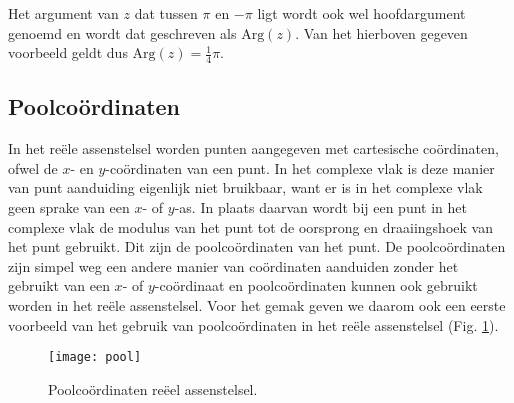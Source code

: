 \documentclass[11pt,fleqn]{book} %
\begin{document}
Het argument van $z$ dat tussen $\pi$ en $-\pi$ ligt wordt ook wel hoofdargument genoemd en wordt dat geschreven als $\text{Arg}(z)$. Van het hierboven gegeven voorbeeld geldt dus $\text{Arg}(z)=\frac{1}{4} \pi$.

\subsection{Poolcoördinaten}
In het reële assenstelsel worden punten aangegeven met cartesische coördinaten, ofwel de $x$- en $y$-coördinaten van een punt. In het complexe vlak is deze manier van punt aanduiding eigenlijk niet bruikbaar, want er is in het complexe vlak geen sprake van een $x$- of $y$-as. In plaats daarvan wordt bij een punt in het complexe vlak de modulus van het punt tot de oorsprong en draaiingshoek van het punt gebruikt. Dit zijn de poolcoördinaten van het punt. De poolcoördinaten zijn simpel weg een andere manier van coördinaten aanduiden zonder het gebruikt van een $x$- of $y$-coördinaat en poolcoördinaten kunnen ook gebruikt worden in het reële assenstelsel. Voor het gemak geven we daarom ook een eerste voorbeeld van het gebruik van poolcoördinaten in het reële assenstelsel (Fig. \ref{fig:pool}).

\begin{figure}[h]
	\centering\texttt{[image: pool]}
	\caption{Poolcoördinaten reëel assenstelsel.}
	\label{fig:pool}
\end{figure}
\end{document}

